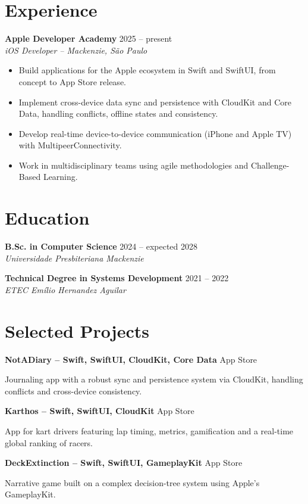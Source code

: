 \documentclass[11pt,a4paper]{article}
\newcommand{\entry}[3]{%
  \textbf{#1} \hfill {\color{muted}#3}\\[1pt]
  {\color{muted}\itshape #2}\par\vspace{2pt}}
\newcommand{\entrysimple}[2]{%
  \textbf{#1} \hfill {\color{muted}#2}\par\vspace{2pt}}
\newenvironment{points}
  {\begin{itemize}[leftmargin=1.2em,itemsep=1pt,topsep=2pt,parsep=0pt]}
  {\end{itemize}}
\begin{document}
\section{Experience}
\entry{Apple Developer Academy}{iOS Developer -- Mackenzie, São Paulo}{2025 -- present}
\begin{points}
  \item Build applications for the Apple ecosystem in Swift and SwiftUI, from concept to App Store release.
  \item Implement cross-device data sync and persistence with CloudKit and Core Data, handling conflicts, offline states and consistency.
  \item Develop real-time device-to-device communication (iPhone and Apple TV) with MultipeerConnectivity.
  \item Work in multidisciplinary teams using agile methodologies and Challenge-Based Learning.
\end{points}

\section{Education}
\entry{B.Sc. in Computer Science}{Universidade Presbiteriana Mackenzie}{2024 -- expected 2028}
\vspace{2pt}
\entry{Technical Degree in Systems Development}{ETEC Emílio Hernandez Aguilar}{2021 -- 2022}

\section{Selected Projects}
\entrysimple{NotADiary \textnormal{\color{muted}-- Swift, SwiftUI, CloudKit, Core Data}}{App Store}
Journaling app with a robust sync and persistence system via CloudKit, handling conflicts and cross-device consistency.
\vspace{3pt}

\entrysimple{Karthos \textnormal{\color{muted}-- Swift, SwiftUI, CloudKit}}{App Store}
App for kart drivers featuring lap timing, metrics, gamification and a real-time global ranking of racers.
\vspace{3pt}

\entrysimple{DeckExtinction \textnormal{\color{muted}-- Swift, SwiftUI, GameplayKit}}{App Store}
Narrative game built on a complex decision-tree system using Apple's GameplayKit.
\vspace{3pt}
\end{document}
